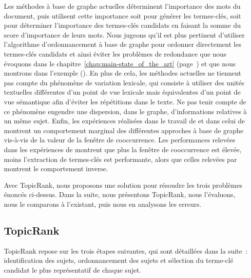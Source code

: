     Les méthodes à base de graphe actuelles déterminent l'importance des mots du
    document, puis utilisent cette importance soit pour générer les termes-clés,
    soit pour déterminer l'importance des termes-clés candidats en faisant la
    somme du score d'importance de leurs mots. Nous jugeons qu'il est plus
    pertinent d'utiliser l'algorithme d'ordonnancement à base de graphe pour
    ordonner directement les termes-clés candidats et ainsi éviter les problèmes
    de redondance que nous évoquons dans le
    chapitre~\ref{chap:main-state_of_the_art}
    (page~\pageref{chap:main-state_of_the_art}) et que nous montrons dans
    l'exemple 
    (). En plus de cela, les méthodes actuelles ne tiennent pas
    compte du phénomène de variation lexicale, qui consiste à utiliser des
    unités textuelles différentes d'un point de vue lexicale mais équivalentes
    d'un point de vue sémantique afin d'éviter les répétitions dans le texte. Ne
    pas tenir compte de ce phénomène engendre une dispersion, dans le graphe,
    d'informations relatives à un même sujet. Enfin, les expériences réalisées
    dans le travail de  et dans celui de
     montrent un comportement marginal des
    différentes approches à base de graphe vis-à-vis de la valeur de la fenêtre
    de cooccurrence. Les performances relevées dans les expériences de
     montrent que plus la fenêtre de cooccurrence
    est élevée, moins l'extraction de termes-clés est performante, alors que
    celles relevées par  montrent le comportement
    inverse. 

    Avec TopicRank, nous proposons une solution pour résoudre les trois
    problèmes énoncés ci-dessus. Dans la suite, nous présentons TopicRank, nous
    l'évaluons, nous le comparons à l'existant, puis nous en analysons les
    erreurs.

    \subsection{TopicRank}
    \label{subsec:main-automatic_keyphrase_annotation-unsupervised_automatic_keyphrase_extraction-topicrank}
      TopicRank repose sur les trois étapes suivantes, qui sont détaillées dans
      la suite~: identification des sujets, ordonnancement des sujets et
      sélection du terme-clé candidat le plus représentatif de chaque sujet.

